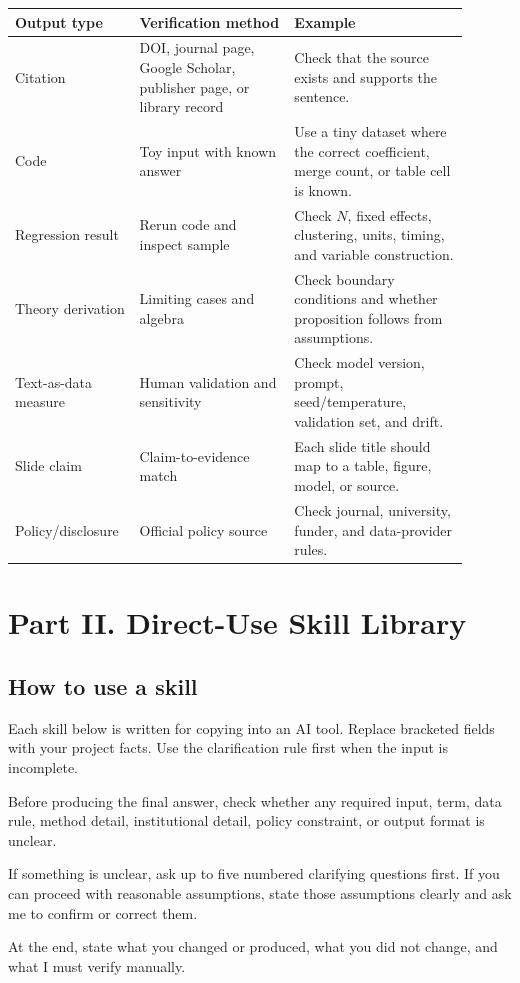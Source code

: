 \documentclass[11pt]{article}
\begin{document}
\begin{longtable}{p{0.22\linewidth}p{0.32\linewidth}p{0.36\linewidth}}
\toprule
\textbf{Output type} & \textbf{Verification method} & \textbf{Example}\\
\midrule
Citation & DOI, journal page, Google Scholar, publisher page, or library record & Check that the source exists and supports the sentence.\\
Code & Toy input with known answer & Use a tiny dataset where the correct coefficient, merge count, or table cell is known.\\
Regression result & Rerun code and inspect sample & Check \(N\), fixed effects, clustering, units, timing, and variable construction.\\
Theory derivation & Limiting cases and algebra & Check boundary conditions and whether proposition follows from assumptions.\\
Text-as-data measure & Human validation and sensitivity & Check model version, prompt, seed/temperature, validation set, and drift.\\
Slide claim & Claim-to-evidence match & Each slide title should map to a table, figure, model, or source.\\
Policy/disclosure & Official policy source & Check journal, university, funder, and data-provider rules.\\
\bottomrule
\end{longtable}

\section{Part II. Direct-Use Skill Library}

\subsection{How to use a skill}

Each skill below is written for copying into an AI tool. Replace bracketed fields with your project facts. Use the clarification rule first when the input is incomplete.

\begin{promptblock}
Before producing the final answer, check whether any required input, term,
data rule, method detail, institutional detail, policy constraint, or output
format is unclear.

If something is unclear, ask up to five numbered clarifying questions first.
If you can proceed with reasonable assumptions, state those assumptions clearly
and ask me to confirm or correct them.

At the end, state what you changed or produced, what you did not change, and
what I must verify manually.
\end{promptblock}
\end{document}
